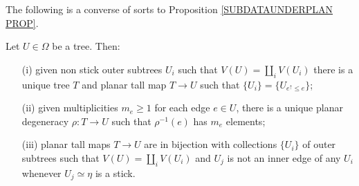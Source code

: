 \documentclass[a4paper,10pt]{article}%
\begin{document}
The following is a converse of sorts to
 Proposition \ref{SUBDATAUNDERPLAN PROP}.

\begin{proposition}\label{BUILDABLE PROP}
	Let $U \in \Omega$ be a tree. Then:
\begin{itemize}
	\item[(i)] given non stick outer subtrees $U_i$ such that 
	$V(U) = \coprod_i V(U_i)$ there is a unique tree $T$ and planar tall map $T \to U$ such that $\{U_i\} = \{U_{e^{\uparrow}\leq e}\}$;
	\item[(ii)] given multiplicities $m_e \geq 1$ for each edge $e \in U$, there is a unique planar degeneracy $\rho \colon T \to U$ such that $\rho^{-1}(e)$ has $m_e$ elements;
	\item[(iii)] planar tall maps $T \to U$ are in bijection with collections $\{U_i\}$ of outer subtrees such that $V(U) = \coprod_i V(U_i)$ and $U_j$ is not an inner edge of any $U_i$ whenever $U_j \simeq \eta$ is a stick.
\end{itemize}
\end{proposition}
\end{document}
